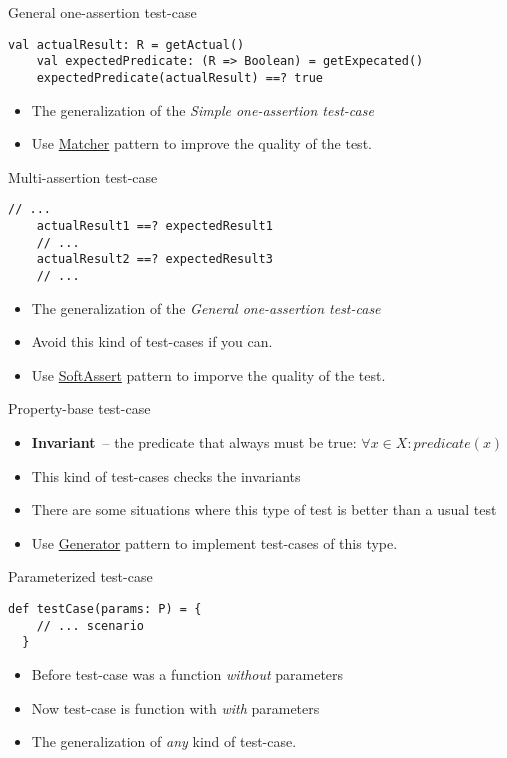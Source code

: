 \documentclass[aspectratio=169]{beamer}
\begin{document}
\begin{frame}[fragile]{General one-assertion test-case}
  \begin{lstlisting}[style=scala]
    val actualResult: R = getActual()
    val expectedPredicate: (R => Boolean) = getExpecated()
    expectedPredicate(actualResult) ==? true 
  \end{lstlisting}
  \begin{itemize}
    \item The generalization of the \textit{Simple one-assertion test-case}
    \item Use \underline{Matcher} pattern to improve the quality of the test.
  \end{itemize}
\end{frame}

\begin{frame}[fragile]{Multi-assertion test-case}
  \begin{lstlisting}[style=scala]
    // ...
    actualResult1 ==? expectedResult1
    // ...
    actualResult2 ==? expectedResult3
    // ...
  \end{lstlisting}
  \begin{itemize}
    \item The generalization of the \textit{General one-assertion test-case}
    \item Avoid this kind of test-cases if you can.
    \item Use \underline{SoftAssert} pattern to imporve the quality of the test.
  \end{itemize}
\end{frame}

\begin{frame}[fragile]{Property-base test-case}
  \begin{itemize}
    \item \textbf{Invariant}~-- the predicate that always must be true: $\forall x \in X: predicate(x)$
    \item This kind of test-cases checks the invariants
    \item There are some situations where this type of test is better than a usual test
    \item Use \underline{Generator} pattern to implement test-cases of this type.
  \end{itemize}
\end{frame}

\begin{frame}[fragile]{Parameterized test-case}
  \begin{lstlisting}[style=scala]
  def testCase(params: P) = {
    // ... scenario
  }
  \end{lstlisting}
  \begin{itemize}
    \item Before test-case was a function \textit{without} parameters
    \item Now test-case is function with \textit{with} parameters
    \item The generalization of \textit{any} kind of test-case.
  \end{itemize}
\end{frame}
\end{document}
